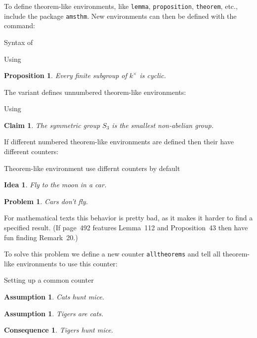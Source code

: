 To define theorem-like environments, like \texttt{lemma}, \texttt{proposition}, \texttt{theorem}, etc., include the package \texttt{amsthm}.
New environments can then be defined with the  command:
\begin{showcode}{Syntax of }
\newtheorem{name of the environment}{title to be printed}
\end{showcode}
\begin{showlatex}{Using }
\newtheorem{proposition}{Proposition}
\begin{proposition}
  Every finite subgroup of $k^\times$ is cyclic.
\end{proposition}
\end{showlatex}
The variant  defines unnumbered theorem-like environments:
\begin{showlatex}{Using }
\newtheorem*{claim}{Claim}
\begin{claim}
  The symmetric group $S_3$ is the smallest non-abelian group.
\end{claim}
\end{showlatex}

If different numbered theorem-like environments are defined then their have different counters:
\begin{showlatex}{Theorem-like environment use differnt counters by default}
\newtheorem{idea}{Idea}
\newtheorem{problem}{Problem}
\begin{idea}
  Fly to the moon in a car.
\end{idea}
\begin{problem}
  Cars don’t fly.
\end{problem}
\end{showlatex}
For mathematical texts this behavior is pretty bad, as it makes it harder to find a specified result.
(If page~492 features Lemma~112 and Proposition~43 then have fun finding Remark~20.)

To solve this problem we define a new counter \texttt{alltheorems} and tell all theorem-like environments to use this counter:
\begin{showlatex}{Setting up a common counter}

\newtheorem{assumption}[alltheorems]{Assumption}
\newtheorem{consequence}[alltheorems]{Consequence}

\begin{assumption}
  Cats hunt mice.
\end{assumption}

\begin{assumption}
  Tigers are cats.
\end{assumption}

\begin{consequence}
  Tigers hunt mice.
\end{consequence}
\end{showlatex}

